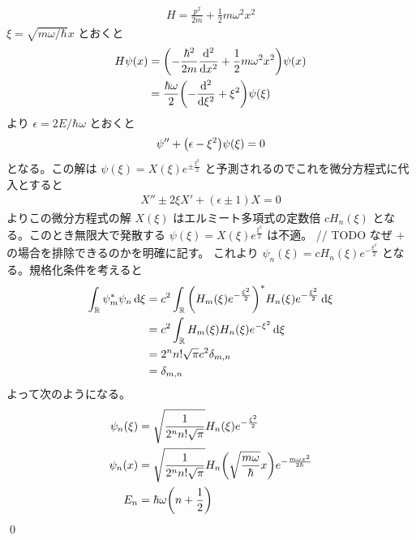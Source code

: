 \documentclass[uplatex,dvipdfmx,a4paper,11pt]{jlreq}
\makeatletter
\newcommand{\RR}{\mathbb{R}}
\theoremstyle{definition}
\renewenvironment{proof}[1][\proofname]{\par
  \normalfont
  \topsep6\p@\@plus6\p@ \trivlist
  \item[\hskip\labelsep{\bfseries #1}\@addpunct{\bfseries}]\ignorespaces\quad\par
}{%
  \qed\endtrivlist\@endpefalse
}
\renewcommand\proofname{証明}
\makeatother
\begin{document}
\begin{proof}
  \begin{align}
    H = \frac{p^2}{2m} + \frac{1}{2}m\omega^2x^2
  \end{align}
  $\xi = \sqrt{m\omega/\hbar}x$ とおくと
  \begin{align}
    H\psi(x) & = \qty(-\frac{\hbar^2}{2m}\dv[2]{x} + \frac{1}{2}m\omega^2x^2)\psi(x) \\
             & = \frac{\hbar\omega}{2}\qty(-\dv[2]{\xi} + \xi^2)\psi(\xi)
  \end{align}
  より $\epsilon = 2E/\hbar\omega$ とおくと
  \begin{align}
    \psi'' + \qty(\epsilon - \xi^2)\psi(\xi) = 0
  \end{align}
  となる。この解は $\psi(\xi) = X(\xi)e^{\pm\frac{\xi^2}{2}}$ と予測されるのでこれを微分方程式に代入とすると
  \begin{align}
    X'' \pm 2\xi X' + (\epsilon\pm 1)X = 0
  \end{align}
  よりこの微分方程式の解 $X(\xi)$ はエルミート多項式の定数倍 $cH_n(\xi)$ となる。このとき無限大で発散する $\psi(\xi) = X(\xi)e^{\frac{\xi^2}{2}}$ は不適。
  // TODO なぜ $+$ の場合を排除できるのかを明確に記す。
  これより $\psi_n(\xi) = cH_n(\xi)e^{-\frac{\xi^2}{2}}$ となる。規格化条件を考えると
  \begin{align}
    \int_\RR \psi_m^*\psi_n\dd{\xi} & = c^2\int_\RR \qty(H_m(\xi)e^{-\frac{\xi^2}{2}})^*H_n(\xi)e^{-\frac{\xi^2}{2}}\dd{\xi} \\
                                    & = c^2\int_\RR H_m(\xi)H_n(\xi)e^{-\xi^2}\dd{\xi}                                       \\
                                    & = 2^nn!\sqrt{\pi}c^2\delta_{m, n}                                                      \\
                                    & = \delta_{m, n}
  \end{align}
  よって次のようになる。
  \begin{align}
    \psi_n(\xi) & = \sqrt{\frac{1}{2^nn!\sqrt{\pi}}}H_n(\xi)e^{-\frac{\xi^2}{2}}                                          \\
    \psi_n(x)   & = \sqrt{\frac{1}{2^nn!\sqrt{\pi}}}H_n\qty(\sqrt{\frac{m\omega}{\hbar}}x)e^{-\frac{m\omega x^2}{2\hbar}} \\
    E_n         & = \hbar\omega\qty(n + \frac{1}{2})
  \end{align}
\end{proof}
\end{document}
